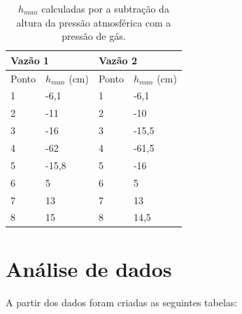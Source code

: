 \documentclass[12pt, twoside, a4]{article}
\begin{document}
\begin{table}[H]
    \centering
    \begin{tabular}{|ll|ll|}
    \hline
        \multicolumn{2}{|l|}{Vazão 1}            & \multicolumn{2}{l|}{Vazão 2}            \\ \hline
        \multicolumn{1}{|l|}{Ponto} & $h_{man}$ (cm) & \multicolumn{1}{l|}{Ponto} & $h_{man}$ (cm) \\ \hline
        \multicolumn{1}{|l|}{1}     & -6,1       & \multicolumn{1}{l|}{1}     & -6,1       \\ \hline
        \multicolumn{1}{|l|}{2}     & -11        & \multicolumn{1}{l|}{2}     & -10        \\ \hline
        \multicolumn{1}{|l|}{3}     & -16        & \multicolumn{1}{l|}{3}     & -15,5      \\ \hline
        \multicolumn{1}{|l|}{4}     & -62        & \multicolumn{1}{l|}{4}     & -61,5      \\ \hline
        \multicolumn{1}{|l|}{5}     & -15,8      & \multicolumn{1}{l|}{5}     & -16        \\ \hline
        \multicolumn{1}{|l|}{6}     & 5          & \multicolumn{1}{l|}{6}     & 5          \\ \hline
        \multicolumn{1}{|l|}{7}     & 13         & \multicolumn{1}{l|}{7}     & 13         \\ \hline
        \multicolumn{1}{|l|}{8}     & 15         & \multicolumn{1}{l|}{8}     & 14,5       \\ \hline
    \end{tabular}
    \caption{$h_{man}$ calculadas por a subtração da altura da pressão atmosférica com a pressão de gás.}
\end{table}


\section{Análise de dados}
A partir dos dados foram criadas as seguintes tabelas:
\end{document}
